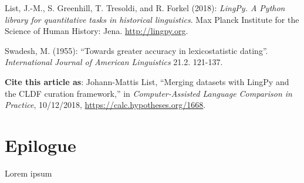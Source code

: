 \documentclass[
  english,
  a4paper,
  oneside,tablecaptionabove
]{scrbook}
\begin{document}
List, J.-M., S. Greenhill, T. Tresoldi, and R. Forkel (2018):
\emph{LingPy. A Python library for quantitative tasks in historical
linguistics}. Max Planck Institute for the Science of Human History:
Jena. \href{//lingpy.org”}{http://lingpy.org}.

Swadesh, M. (1955): ``Towards greater accuracy in lexicostatistic
dating''. \emph{International Journal of American Linguistics} 21.2.
121-137.

\textbf{Cite this article as}: Johann-Mattis List, ``Merging datasets
with LingPy and the CLDF curation framework,'' in \emph{Computer-Assisted
Language Comparison in Practice}, 10/12/2018,
\url{https://calc.hypotheses.org/1668}.

\chapter{Epilogue}

Lorem ipsum
\end{document}
